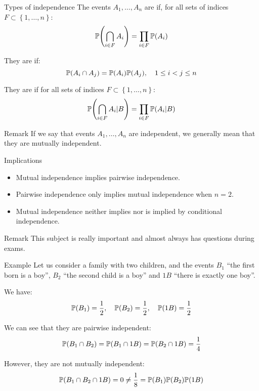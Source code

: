 \documentclass[a4paper]{article}
\begin{document}
\begin{parag}{Types of independence}
    The events $A_1, \ldots, A_n$ are  if, for all sets of indices $F \subset \left\{1, \ldots, n\right\}$: 
    \[\prob\left(\bigcap_{i \in F}^{} A_i\right) = \prod_{i \in F}^{} \prob\left(A_i\right)\]
    
    They are  if: 
    \[\prob\left(A_i \cap A_j\right) = \prob\left(A_i\right)\prob\left(A_j\right), \mathspace 1 \leq i < j \leq n\]
    
    They are  if for all sets of indices $F \subset \left\{1, \ldots, n\right\}$: 
    \[\prob\left(\bigcap_{i \in F}^{} A_i | B\right) = \prod_{i \in F}^{} \prob\left(A_i| B\right)\]

    \begin{subparag}{Remark}
        If we say that events $A_1, \ldots, A_n$ are independent, we generally mean that they are mutually independent.
    \end{subparag}

    \begin{subparag}{Implications}
        \begin{itemize}[left=0pt]
            \item Mutual independence implies pairwise independence.
            \item Pairwise independence only implies mutual independence when $n = 2$.
            \item Mutual independence neither implies nor is implied by conditional independence.
        \end{itemize}
    \end{subparag}

    \begin{subparag}{Remark}
        This subject is really important and almost always has questions during exams.
    \end{subparag}
    
\end{parag}

\begin{parag}{Example}
    Let us consider a family with two children, and the events $B_1$ ``the first born is a boy'', $B_2$ ``the second child is a boy'' and $1B$ ``there is exactly one boy''.

    We have: 
    \[\prob\left(B_1\right) = \frac{1}{2}, \mathspace \prob\left(B_2\right) = \frac{1}{2}, \mathspace \prob\left(1B\right) = \frac{1}{2}\]

    We can see that they are pairwise independent: 
    \[\prob\left(B_1 \cap B_2\right) = \prob\left(B_1 \cap 1B\right) = \prob\left(B_2 \cap 1B\right) = \frac{1}{4}\]
    
    However, they are not mutually independent: 
    \[\prob\left(B_1 \cap B_2 \cap 1B\right) = 0 \neq \frac{1}{8} = \prob\left(B_1\right)\prob\left(B_2\right)\prob\left(1B\right)\]
\end{parag}
\end{document}
